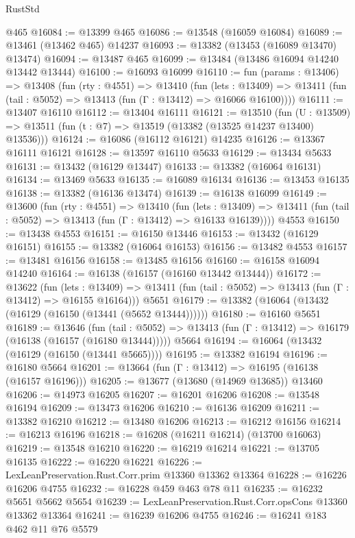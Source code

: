 \begin{lexlean}{RustStd}
\begin{coremodule}
    @465
@16084 := @13399 @465
@16086 := @13548 (@16059 @16084)
@16089 := @13461 (@13462 @465) @14237
@16093 := @13382 (@13453 (@16089 @13470) @13474)
@16094 := @13487 @465
@16099 := @13484 (@13486 @16094 @14240 @13442 @13444)
@16100 := @16093 @16099
@16110 := fun (params : @13406) =>
  @13408
    (fun (rty : @4551) =>
    @13410
      (fun (lets : @13409) =>
      @13411 (fun (tail : @5052) => @13413 (fun (Γ : @13412) => @16066 @16100))))
@16111 := @13407 @16110
@16112 := @13404 @16111
@16121 := @13510
    (fun (U : @13509) => @13511 (fun (t : @7) => @13519 (@13382 (@13525 @14237 @13400) @13536)))
@16124 := @16086 (@16112 @16121) @14235
@16126 := @13367 @16111 @16121
@16128 := @13597 @16110 @5633
@16129 := @13434 @5633
@16131 := @13432 (@16129 @13447)
@16133 := @13382 (@16064 @16131)
@16134 := @13469 @5633
@16135 := @16089 @16134
@16136 := @13453 @16135
@16138 := @13382 (@16136 @13474)
@16139 := @16138 @16099
@16149 := @13600
    (fun (rty : @4551) =>
    @13410
      (fun (lets : @13409) =>
      @13411 (fun (tail : @5052) => @13413 (fun (Γ : @13412) => @16133 @16139))))
    @4553
@16150 := @13438 @4553
@16151 := @16150 @13446
@16153 := @13432 (@16129 @16151)
@16155 := @13382 (@16064 @16153)
@16156 := @13482 @4553
@16157 := @13481 @16156
@16158 := @13485 @16156
@16160 := @16158 @16094 @14240
@16164 := @16138 (@16157 (@16160 @13442 @13444))
@16172 := @13622
    (fun (lets : @13409) =>
    @13411 (fun (tail : @5052) => @13413 (fun (Γ : @13412) => @16155 @16164)))
    @5651
@16179 := @13382 (@16064 (@13432 (@16129 (@16150 (@13441 (@5652 @13444))))))
@16180 := @16160 @5651
@16189 := @13646
    (fun (tail : @5052) => @13413 (fun (Γ : @13412) => @16179 (@16138 (@16157 (@16180 @13444)))))
    @5664
@16194 := @16064 (@13432 (@16129 (@16150 (@13441 @5665))))
@16195 := @13382 @16194
@16196 := @16180 @5664
@16201 := @13664 (fun (Γ : @13412) => @16195 (@16138 (@16157 @16196)))
@16205 := @13677 (@13680 (@14969 @13685)) @13460
@16206 := @14973 @16205
@16207 := @16201 @16206
@16208 := @13548 @16194
@16209 := @13473 @16206
@16210 := @16136 @16209
@16211 := @13382 @16210
@16212 := @13480 @16206
@16213 := @16212 @16156
@16214 := @16213 @16196
@16218 := @16208 (@16211 @16214) (@13700 @16063)
@16219 := @13548 @16210
@16220 := @16219 @16214
@16221 := @13705 @16135
@16222 := @16220 @16221
@16226 := LexLeanPreservation.Rust.Corr.prim @13360 @13362 @13364
@16228 := @16226 @16206 @4755
@16232 := @16228 @459 @463 @78 @11
@16235 := @16232 @5651 @5662 @5654
@16239 := LexLeanPreservation.Rust.Corr.opsCons @13360 @13362 @13364
@16241 := @16239 @16206 @4755
@16246 := @16241 @183 @462 @11 @76 @5579

\end{coremodule}
\end{lexlean}
